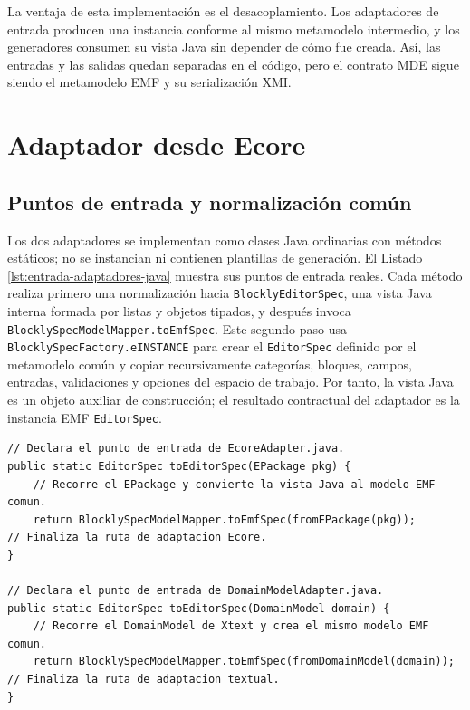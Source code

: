 La ventaja de esta implementación es el desacoplamiento. Los adaptadores de
entrada producen una instancia conforme al mismo metamodelo intermedio, y los
generadores consumen su vista Java sin depender de cómo fue creada. Así, las
entradas y las salidas quedan separadas en el código, pero el contrato MDE sigue
siendo el metamodelo EMF y su serialización XMI.

\section{Adaptador desde Ecore}
\label{sec:implementacion-ecore-adapter}

\subsection{Puntos de entrada y normalización común}

Los dos adaptadores se implementan como clases Java ordinarias con métodos
estáticos; no se instancian ni contienen plantillas de generación. El Listado
\ref{lst:entrada-adaptadores-java} muestra sus puntos de entrada reales. Cada
método realiza primero una normalización hacia \texttt{BlocklyEditorSpec}, una
vista Java interna formada por listas y objetos tipados, y después invoca
\texttt{BlocklySpecModelMapper.toEmfSpec}. Este segundo paso usa
\texttt{BlocklySpecFactory.eINSTANCE} para crear el \texttt{EditorSpec} definido
por el metamodelo común y copiar recursivamente categorías, bloques, campos,
entradas, validaciones y opciones del espacio de trabajo. Por tanto, la vista Java es un
objeto auxiliar de construcción; el resultado contractual del adaptador es la
instancia EMF \texttt{EditorSpec}.

\begin{lstlisting}[float=htbp, style=tfmjavaecore, caption={Puntos de entrada Java de los dos adaptadores}, label={lst:entrada-adaptadores-java}]
// Declara el punto de entrada de EcoreAdapter.java.
public static EditorSpec toEditorSpec(EPackage pkg) {
    // Recorre el EPackage y convierte la vista Java al modelo EMF comun.
    return BlocklySpecModelMapper.toEmfSpec(fromEPackage(pkg));
// Finaliza la ruta de adaptacion Ecore.
}

// Declara el punto de entrada de DomainModelAdapter.java.
public static EditorSpec toEditorSpec(DomainModel domain) {
    // Recorre el DomainModel de Xtext y crea el mismo modelo EMF comun.
    return BlocklySpecModelMapper.toEmfSpec(fromDomainModel(domain));
// Finaliza la ruta de adaptacion textual.
}
\end{lstlisting}

